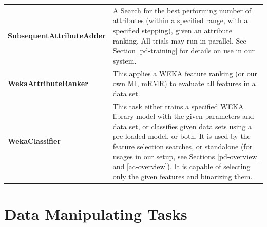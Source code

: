 \documentclass[12pt,notitlepage,a4paper]{report}
\begin{document}
\begin{longtable}{p{}p{}}
\bf SubsequentAttributeAdder & A Search for the best performing number of attributes (within a specified range, with a specified stepping), given an attribute ranking. All trials may run in parallel. See Section \ref{pd-training} for details on use in our system. \\
\bf WekaAttributeRanker & This applies a WEKA feature ranking (or our own MI, mRMR) to evaluate all features in a data set. \\
\bf WekaClassifier  & This task either trains a specified WEKA library model with the given parameters and data set, or classifies given data sets using a pre-loaded model, or both. It is used by the feature selection searches, or standalone (for usages in our setup, see Sections \ref{pd-overview} and \ref{ac-overview}). It is capable of selecting only the given features and binarizing them. \\
\end{longtable}

\section*{Data Manipulating Tasks}
\end{document}
